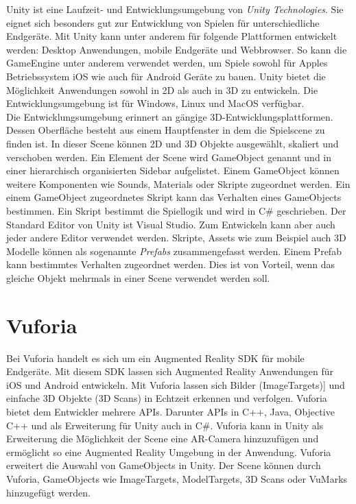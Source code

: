 Unity ist eine Laufzeit- und Entwicklungsumgebung von \textit{Unity Technologies}. Sie eignet sich besonders gut zur Entwicklung von Spielen für unterschiedliche Endgeräte. Mit Unity kann unter anderem für folgende Plattformen entwickelt werden: Desktop Anwendungen, mobile Endgeräte und Webbrowser. So kann die GameEngine unter anderem verwendet werden, um Spiele sowohl für Apples Betriebssystem iOS wie auch für Android Geräte zu bauen. Unity bietet die Möglichkeit Anwendungen sowohl in 2D als auch in 3D zu entwickeln. Die Entwicklungsumgebung ist für Windows, Linux und MacOS verfügbar. \\
Die Entwicklungsumgebung erinnert an gängige 3D-Entwicklungsplattformen. Dessen Oberfläche besteht aus einem Hauptfenster in dem die Spielscene zu finden ist. In dieser Scene können 2D und 3D Objekte ausgewählt, skaliert und verschoben werden. Ein Element der Scene wird GameObject genannt und in einer hierarchisch organisierten Sidebar aufgelistet. Einem GameObject können weitere Komponenten wie Sounds, Materials oder Skripte zugeordnet werden. Ein einem GameObject zugeordnetes Skript kann das Verhalten eines GameObjects bestimmen. Ein Skript bestimmt die Spiellogik und wird in C\# geschrieben. Der Standard Editor von Unity ist Visual Studio. Zum Entwickeln kann aber auch jeder andere Editor verwendet werden. Skripte, Assets wie zum Beispiel auch 3D Modelle können als sogenannte \textit{Prefabs} zusammengefasst werden. Einem Prefab kann bestimmtes Verhalten zugeordnet werden. Dies ist von Vorteil, wenn das gleiche Objekt mehrmals in einer Scene verwendet werden soll.\cite{UnityGameEngine}

\section{Vuforia}
Bei Vuforia handelt es sich um ein Augmented Reality SDK für mobile Endgeräte. Mit diesem SDK lassen sich Augmented Reality Anwendungen für iOS und Android entwickeln. Mit Vuforia lassen sich Bilder (ImageTargets)] und einfache 3D Objekte (3D Scans) in Echtzeit erkennen und verfolgen. Vuforia bietet dem Entwickler mehrere APIs. Darunter APIs in C++, Java, Objective C++ und als Erweiterung für Unity auch in C\#. Vuforia kann in Unity als Erweiterung die Möglichkeit der Scene eine AR-Camera hinzuzufügen und ermöglicht so eine Augmented Reality Umgebung in der Anwendung. Vuforia erweitert die Auswahl von GameObjects in Unity. Der Scene können durch Vuforia, GameObjects wie ImageTargets, ModelTargets, 3D Scans oder VuMarks hinzugefügt werden.\cite{VuforiaEngine}

